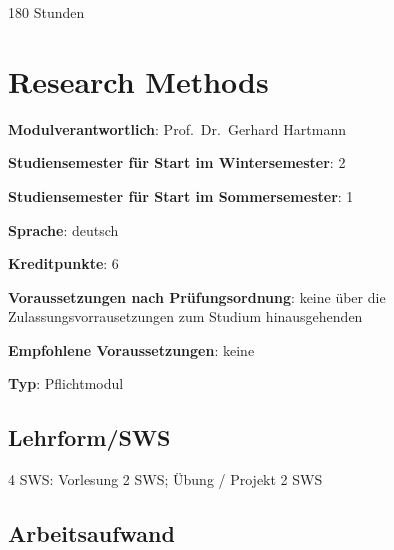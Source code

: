 180 Stunden

\chapter{Research
Methods\label{/mi-2017/modulbeschreibungen-master/MA_All_Research_Methods}}\label{research-methodspathlabelmi-2017modulbeschreibungen-mastermaux5fallux5fresearchux5fmethods}

\begin{modulHead}
\textbf{Modulverantwortlich}: Prof.~Dr.~Gerhard
Hartmann
\end{modulHead}
\begin{modulHead}
\textbf{Studiensemester für
Start im Wintersemester}:
2
\end{modulHead}
\begin{modulHead}
\textbf{Studiensemester für Start
im Sommersemester}:
1
\end{modulHead}
\begin{modulHead}
\textbf{Sprache}:
deutsch
\end{modulHead}
\begin{modulHead}
\textbf{Kreditpunkte}:
6
\end{modulHead}
\begin{modulHead}
\textbf{Voraussetzungen nach
Prüfungsordnung}: keine über die Zulassungsvorrausetzungen zum Studium
hinausgehenden
\end{modulHead}
\begin{modulHead}
\textbf{Empfohlene
Voraussetzungen}: keine
\end{modulHead}
\begin{modulHead}
\textbf{Typ}:
Pflichtmodul
\end{modulHead}


\section*{Lehrform/SWS\label{/mi-2017/modulbeschreibungen-master/MA_All_Research_Methods}}\label{lehrformswspathlabelmi-2017modulbeschreibungen-mastermaux5fallux5fresearchux5fmethods}

4 SWS: Vorlesung 2 SWS; Übung / Projekt 2 SWS

\section*{Arbeitsaufwand\label{/mi-2017/modulbeschreibungen-master/MA_All_Research_Methods}}\label{arbeitsaufwandpathlabelmi-2017modulbeschreibungen-mastermaux5fallux5fresearchux5fmethods}

